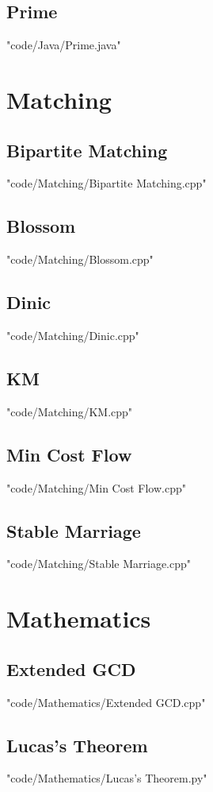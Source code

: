 \documentclass [landscape,8pt,a4paper,twocolumn]{article}
\begin{document}
\subsection{Prime}
 {"code/Java/Prime.java"}
\section{Matching}
\subsection{Bipartite Matching}
 {"code/Matching/Bipartite Matching.cpp"}
\subsection{Blossom}
 {"code/Matching/Blossom.cpp"}
\subsection{Dinic}
 {"code/Matching/Dinic.cpp"}
\subsection{KM}
 {"code/Matching/KM.cpp"}
\subsection{Min Cost Flow}
 {"code/Matching/Min Cost Flow.cpp"}
\subsection{Stable Marriage}
 {"code/Matching/Stable Marriage.cpp"}
\section{Mathematics}
\subsection{Extended GCD}
 {"code/Mathematics/Extended GCD.cpp"}
\subsection{Lucas's Theorem}
 {"code/Mathematics/Lucas's Theorem.py"}
\end{document}
